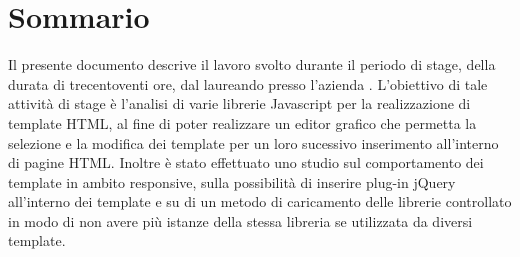 
\cleardoublepage
{}
{}
\begingroup
\let\clearpage\relax
\let\cleardoublepage\relax
\let\cleardoublepage\relax

\chapter*{Sommario}

Il presente documento descrive il lavoro svolto durante il periodo di stage, della durata di trecentoventi ore, dal laureando \myName presso l'azienda \myCompany.
L'obiettivo di tale attività di stage è l'analisi di varie librerie Javascript per la realizzazione di template HTML, al fine di poter realizzare un editor grafico che permetta la selezione e la modifica dei template per un loro sucessivo inserimento all'interno di pagine HTML.
Inoltre è stato effettuato uno studio sul comportamento dei template in ambito responsive, sulla possibilità di inserire plug-in jQuery all'interno dei template e su di un metodo di caricamento delle librerie controllato in modo di non avere più istanze della stessa libreria se utilizzata da diversi template.
%
%

\endgroup			

\vfill

